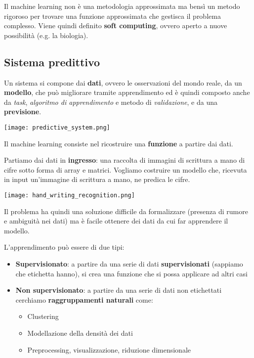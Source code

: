 \begin{note}
	Il machine learning non è una metodologia approssimata ma bensì un metodo rigoroso per trovare una funzione approssimata che gestisca il problema complesso. Viene quindi definito \textbf{soft computing}, ovvero aperto a nuove possibilità (e.g. la biologia).
\end{note}

\subsection{Sistema predittivo}
Un sistema si compone dai \textbf{dati}, ovvero le osservazioni del mondo reale, da un \textbf{modello}, che può migliorare tramite apprendimento ed è quindi composto anche da \textit{task}, \textit{algoritmo di apprendimento} e metodo di \textit{validazione}, e da una \textbf{previsione}. 
\begin{center}
	\texttt{[image: predictive\_system.png]}
\end{center}

Il machine learning consiste nel ricostruire una \textbf{funzione} a partire dai dati.
\begin{example}
	Partiamo dai dati in \textbf{ingresso}: una raccolta di immagini di scrittura a mano di cifre sotto forma di array e matrici. Vogliamo costruire un modello che, ricevuta in input un'immagine di scrittura a mano, ne predica le cifre.
	
	\begin{center}
		\texttt{[image: hand\_writing\_recognition.png]}
	\end{center}
	Il problema ha quindi una soluzione difficile da formalizzare (presenza di rumore e ambiguità nei dati) ma è facile ottenere dei dati da cui far apprendere il modello.\\
\end{example}

L'apprendimento può essere di due tipi:
\begin{itemize}
	\item \textbf{Supervisionato}: a partire da una serie di dati \textbf{supervisionati} (sappiamo che etichetta hanno), si crea una funzione che si possa applicare ad altri casi
	\item \textbf{Non supervisionato}: a partire da una serie di dati non etichettati cerchiamo \textbf{raggruppamenti naturali} come:
	\begin{itemize}
		\item Clustering
		\item Modellazione della densità dei dati
		\item Preprocessing, visualizzazione, riduzione dimensionale
	\end{itemize}
\end{itemize}


